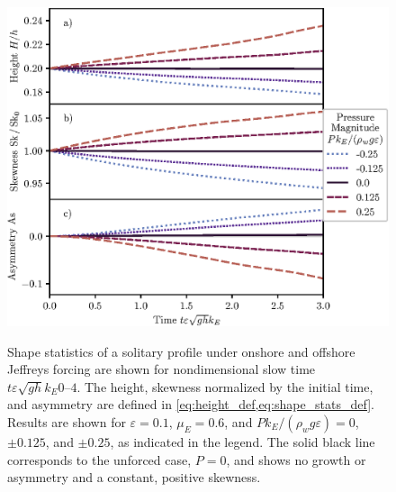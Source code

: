 \documentclass{jfm}
\renewcommand*{\epsilon}{\varepsilon}
\begin{document}
\begin{figure}
  \centering
  { %
    \label{fig:statistics_solitary:a}
    \label{fig:statistics_solitary:b}
    \label{fig:statistics_solitary:c}
  }
  \includegraphics{Skew-Asymm-Production.eps}
  \caption{
    Shape statistics of a solitary profile under onshore and offshore
    Jeffreys forcing are shown for nondimensional slow time $t \epsilon
    \sqrt{gh} k_E \numrange{0}{4}$.
    The
    height,
    skewness normalized by the initial time, and
    asymmetry are defined in
    \cref{eq:height_def,eq:shape_stats_def}.
    Results are shown for $\epsilon=0.1$, $\mu_E = 0.6$, and $P
    k_E/(\rho_w g \epsilon) = 0$, $\pm 0.125$, and $\pm 0.25$, as
    indicated in the legend.
    The solid black line corresponds to the unforced case, $P = 0$, and
    shows no growth or asymmetry and a constant, positive skewness.
  }\label{fig:statistics_solitary}
\end{figure}
\end{document}
